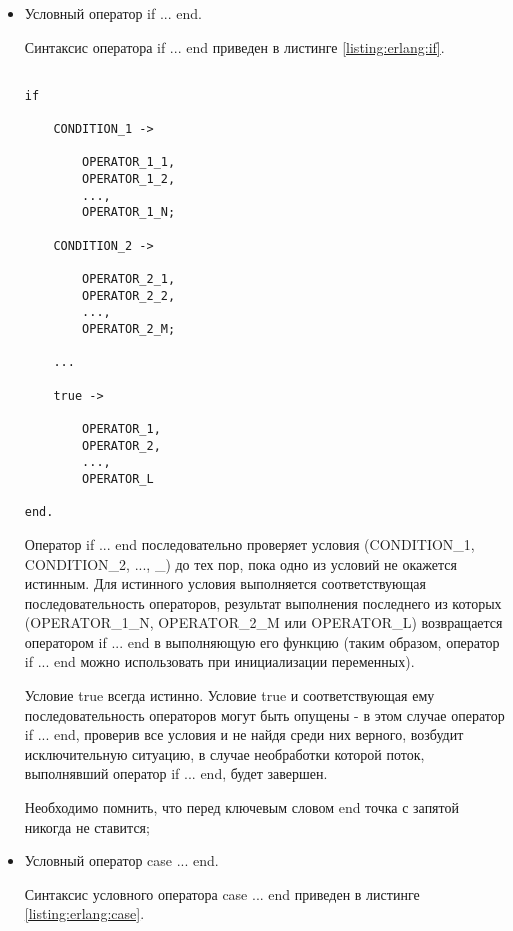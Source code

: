 \begin{itemize}

	\item Условный оператор if ... end.

		Синтаксис оператора if ... end приведен в листинге \ref{listing:erlang:if}.

\begin{lstlisting}

if
	
	CONDITION_1 ->

		OPERATOR_1_1,
		OPERATOR_1_2,
		...,
		OPERATOR_1_N;

	CONDITION_2 ->

		OPERATOR_2_1,
		OPERATOR_2_2,
		...,
		OPERATOR_2_M;

	...

	true ->

		OPERATOR_1,
		OPERATOR_2,
		...,
		OPERATOR_L

end.

\end{lstlisting}
\mylistingend

		Оператор if ... end последовательно проверяет условия (CONDITION\_1, CONDITION\_2, ..., \_) до тех пор, пока одно из условий не окажется истинным. Для истинного условия выполняется соответствующая последовательность операторов, результат выполнения последнего из которых (OPERATOR\_1\_N, OPERATOR\_2\_M или OPERATOR\_L) возвращается оператором if ... end в выполняющую его функцию (таким образом, оператор if ... end можно использовать при инициализации переменных).

		Условие true всегда истинно. Условие true и соответствующая ему последовательность операторов могут быть опущены - в этом случае оператор if ... end, проверив все условия и не найдя среди них верного, возбудит исключительную ситуацию, в случае необработки которой поток, выполнявший оператор if ... end, будет завершен.

		Необходимо помнить, что перед ключевым словом end точка с запятой никогда не ставится;

	\item Условный оператор case ... end.

		Синтаксис условного оператора case ... end приведен в листинге \ref{listing:erlang:case}.

\begin{lstlisting}


\end{lstlisting}
\end{itemize}
